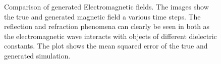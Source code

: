 \documentclass{article}
\begin{document}
\begin{figure}[!t]
\caption{ Comparison of generated Electromagnetic fields. The images show the true and generated magnetic field a various time steps. The reflection and refraction phenomena can clearly be seen in both as the electromagnetic wave interacts with objects of different dielectric constants. The plot shows the mean squared error of the true and generated simulation.}
\label{em_dataset}
\end{figure}
\end{document}
